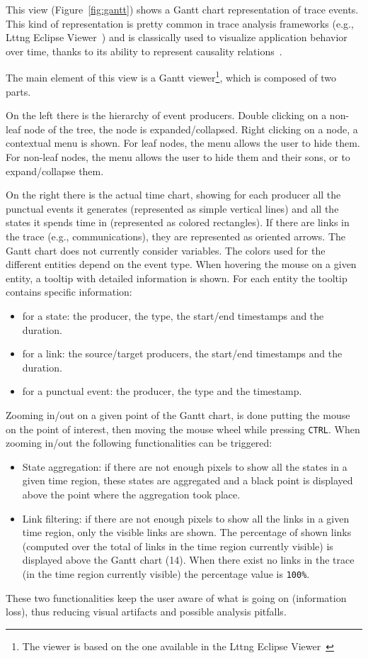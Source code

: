 \documentclass[twoside]{article}
\begin{document}
\begin{sloppypar}
This view (Figure~\ref{fig:gantt}) shows a Gantt chart representation of trace events.
This kind of representation is pretty common in trace analysis frameworks (e.g., Lttng Eclipse Viewer~\cite{lttng_viewer}) and is classically used to visualize application behavior over time, thanks to its ability to represent causality relations~\cite{wilson_gantt_2003}.

The main element of this view is a Gantt viewer\footnote{The viewer is based on the one available in the Lttng Eclipse Viewer~\cite{lttng_viewer}}, which is composed of two parts.

On the left there is the hierarchy of event producers. 
Double clicking on a non-leaf node of the tree, the node is expanded/collapsed.
Right clicking on a node, a contextual menu is shown. 
For leaf nodes, the menu allows the user to hide them.
For non-leaf nodes, the menu allows the user to hide them and their sons, or to expand/collapse them.

On the right there is the actual time chart, showing for each producer all the punctual events it generates (represented as simple vertical lines) and all the states it spends time in (represented as colored rectangles). 
If there are links in the trace (e.g., communications), they are represented as oriented arrows.
The Gantt chart does not currently consider variables.
The colors used for the different entities depend on the event type.
When hovering the mouse on a given entity, a tooltip with detailed information is shown.
For each entity the tooltip contains specific information:
\begin{itemize}
 \item for a state: the producer, the type, the start/end timestamps and the duration.
 \item for a link: the source/target producers, the start/end timestamps and the duration.
 \item for a punctual event: the producer, the type and the timestamp.
\end{itemize}

Zooming in/out on a given point of the Gantt chart, is done putting the mouse on the point of interest, then moving the mouse wheel while pressing \texttt{CTRL}.
When zooming in/out the following functionalities can be triggered:
\begin{itemize}
 \item State aggregation: if there are not enough pixels to show all the states in a given time region, these states are aggregated and a black point is displayed above the point where the aggregation took place. 
 \item Link filtering: if there are not enough pixels to show all the links in a given time region, only the visible links are shown. 
 The percentage of shown links (computed over the total of links in the time region currently visible) is displayed above the Gantt chart (\num{14}).
 When there exist no links in the trace (in the time region currently visible) the percentage value is \texttt{100\%}.
\end{itemize}
These two functionalities keep the user aware of what is going on (information loss), thus reducing visual artifacts and possible analysis pitfalls.


\end{sloppypar}
\end{document}
